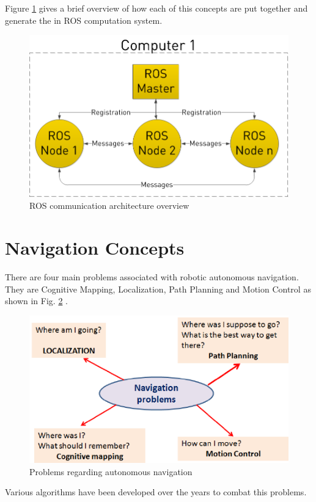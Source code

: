 
Figure \ref{fig:rosgraph} gives a brief overview of how each of this concepts are put together and  generate the in ROS  computation system.

\begin{figure}[h] 
\centerline{\includegraphics [width=0.8 \textwidth]{imgs/chapter3/rosgraph.png}}
\caption{ROS communication architecture overview \cite{rosbasics}}
\label{fig:rosgraph}
\end{figure}


\section {Navigation Concepts}
There are four main problems associated with robotic autonomous navigation. They are Cognitive Mapping, Localization, Path Planning and Motion Control \cite{nav} as shown in Fig. \ref{fig:probNav} . 

\begin{figure}[h] 
\centerline{\includegraphics [width=0.8 \textwidth]{imgs/chapter3/probNAV.png}}
\caption{Problems regarding autonomous navigation \cite{nav}}
\label{fig:probNav}
\end{figure}
Various algorithms have been developed over the years to combat this problems. 

